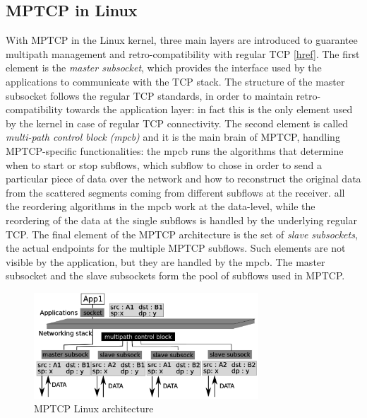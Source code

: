 \subsection{MPTCP in Linux}
With MPTCP in the Linux kernel, three main layers are introduced to guarantee multipath management and retro-compatibility with regular TCP [\href{http://inl.info.ucl.ac.be/publications/multipath-tcp-theory-practice}{href}]. The first element is the \textit{master subsocket}, which provides the interface used by the applications to communicate with the TCP stack. The structure of the master subsocket follows the regular TCP standards, in order to maintain retro-compatibility towards the application layer: in fact this is the only element used by the kernel in case of regular TCP connectivity. The second element is called \textit{multi-path control block (mpcb)} and it is the main brain of MPTCP, handling MPTCP-specific functionalities: the mpcb runs the algorithms that determine when to start or stop subflows, which subflow to chose in order to send a particular piece of data over the network and how to reconstruct the original data from the scattered segments coming from different subflows at the receiver. all the reordering algorithms in the mpcb work at the data-level, while the reordering of the data at the single subflows is handled by the underlying regular TCP. The final element of the MPTCP architecture is the set of \textit{slave subsockets}, the actual endpoints for the multiple MPTCP subflows. Such elements are not visible by the application, but they are handled by the mpcb. 
The master subsocket and the slave subsockets form the pool of subflows used in MPTCP.

\begin{figure}[!htb]
\centering
\includegraphics[width=0.75\textwidth]{images/architecture}
\caption{MPTCP Linux architecture}
\label{fig:architecture}
\end{figure}


